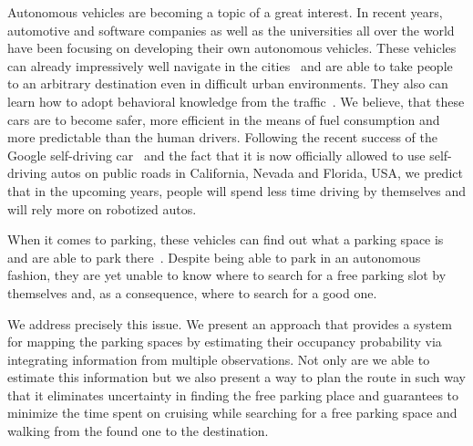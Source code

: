 Autonomous vehicles are becoming a topic of a great interest. In recent years,
automotive and software companies as well as the universities all over the
world have been focusing on developing their own autonomous vehicles. These
vehicles can already impressively well navigate in the
cities~\cite{stanley_auto_car,perceprion_drivec_car,lima13,daimler} and are
able to take people to an arbitrary destination even in difficult urban
environments. They also can learn how to adopt behavioral knowledge from the
traffic~\cite{behaviour_learning,spinello10:multiclass}. We believe, that
these cars are to become safer, more efficient in the means of fuel
consumption and more predictable than the human drivers. Following the recent
success of the Google self-driving car~\cite{markoff2010google} and the fact
that it is now officially allowed to use self-driving autos on public roads in
California, Nevada and Florida, USA, we predict that in the upcoming years,
people will spend less time driving by themselves and will rely more on
robotized autos.

When it comes to parking, these vehicles can find out what a parking space is
and are able to park
there~\cite{auto_cars_burgard,auto_parking09,auto_park2_11}. Despite being
able to park in an autonomous fashion, they are yet unable to know where to
search for a free parking slot by themselves and, as a consequence, where to
search for a good one.

We address precisely this issue. We present an approach that provides a system
for mapping the parking spaces by estimating their occupancy probability via
integrating information from multiple observations. Not only are we able to
estimate this information but we also present a way to plan the route in such
way that it eliminates uncertainty in finding the free parking place and
guarantees to minimize the time spent on cruising while searching for a free
parking space and walking from the found one to the destination.

